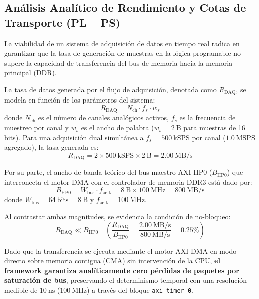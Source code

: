 \documentclass[standalone]{subfiles}
\begin{document}
\subsection{Análisis Analítico de Rendimiento y Cotas de Transporte (PL -- PS)}
\label{subsec:analisis_transporte}

La viabilidad de un sistema de adquisición de datos en tiempo real radica en garantizar que la tasa de generación de muestras en la lógica programable no supere la capacidad de transferencia del bus de memoria hacia la memoria principal (DDR). 

La tasa de datos generada por el flujo de adquisición, denotada como $R_{\text{DAQ}}$, se modela en función de los parámetros del sistema:
\begin{equation}
    R_{\text{DAQ}} = N_{\text{ch}} \cdot f_s \cdot w_s
    \label{eq:throughput_daq}
\end{equation}
donde $N_{\text{ch}}$ es el número de canales analógicos activos, $f_s$ es la frecuencia de muestreo por canal y $w_s$ es el ancho de palabra ($w_s = 2~\text{B}$ para muestras de 16 bits). Para una adquisición dual simultánea a $f_s = 500~\text{kSPS}$ por canal ($1.0~\text{MSPS}$ agregado), la tasa generada es:
\begin{equation}
    R_{\text{DAQ}} = 2 \times 500~\text{kSPS} \times 2~\text{B} = 2.00~\text{MB/s}
    \label{eq:throughput_numeric}
\end{equation}

Por su parte, el ancho de banda teórico del bus maestro AXI-HP0 ($B_{\text{HP0}}$) que interconecta el motor DMA con el controlador de memoria DDR3 está dado por:
\begin{equation}
    B_{\text{HP0}} = W_{\text{bus}} \cdot f_{\text{aclk}} = 8~\text{B} \times 100~\text{MHz} = 800~\text{MB/s}
    \label{eq:bandwidth_hp0}
\end{equation}
donde $W_{\text{bus}} = 64~\text{bits} = 8~\text{B}$ y $f_{\text{aclk}} = 100~\text{MHz}$.

Al contrastar ambas magnitudes, se evidencia la condición de no-bloqueo:
\begin{equation}
    R_{\text{DAQ}} \ll B_{\text{HP0}} \quad \left( \frac{R_{\text{DAQ}}}{B_{\text{HP0}}} = \frac{2.00~\text{MB/s}}{800~\text{MB/s}} = 0.25\% \right)
    \label{eq:ratio_bound}
\end{equation}

Dado que la transferencia se ejecuta mediante el motor AXI DMA en modo directo sobre memoria contigua (CMA) sin intervención de la CPU, \textbf{el framework garantiza analíticamente cero pérdidas de paquetes por saturación de bus}, preservando el determinismo temporal con una resolución medible de $10~\text{ns}$ ($100~\text{MHz}$) a través del bloque \texttt{axi\_timer\_0}.
\end{document}
